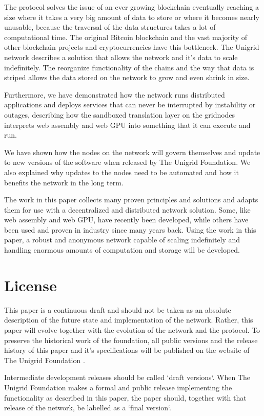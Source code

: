 \documentclass[10pt,a4paper,final]{article}
\begin{document}
The protocol solves the issue of an ever growing blockchain eventually reaching a size where it takes a very big amount of data to store or where it becomes nearly unusable, because the traversal of the data structures takes a lot of computational time. The original Bitcoin blockchain and the vast majority of other blockchain projects and cryptocurrencies have this bottleneck. The Unigrid network describes a solution that allows the network and it's data to scale indefinitely. The reorganize functionality of the chains and the way that data is striped allows the data stored on the network to grow and even shrink in size.

Furthermore, we have demonstrated how the network runs distributed applications and deploys services that can never be interrupted by instability or outages, describing how the sandboxed translation layer on the \glspl{gridnode} interprets web assembly and web GPU into something that it can execute and run.

We have shown how the nodes on the network will govern themselves and update to new versions of the software when released by The Unigrid Foundation. We also explained why updates to the nodes need to be automated and how it benefits the network in the long term.

The work in this paper collects many proven principles and solutions and adapts them for use with a decentralized and distributed network solution. Some, like web assembly and web GPU, have recently been developed, while others have been used and proven in industry since many years back. Using the work in this paper, a robust and anonymous network capable of scaling indefinitely and handling enormous amounts of computation and storage will be developed.

\section{License}
This paper is a continuous draft and should not be taken as an absolute description of the future state and implementation of the network. Rather, this paper will evolve together with the evolution of the network and the protocol. To preserve the historical work of the foundation, all public versions and the release history of this paper and it's specifications will be published on the website of The Unigrid Foundation \cite{unigrid}.

Intermediate development releases should be called `draft versions`. When The Unigrid Foundation makes a formal and public release implementing the functionality as described in this paper, the paper should, together with that release of the network, be labelled as a `final version`.
\end{document}
